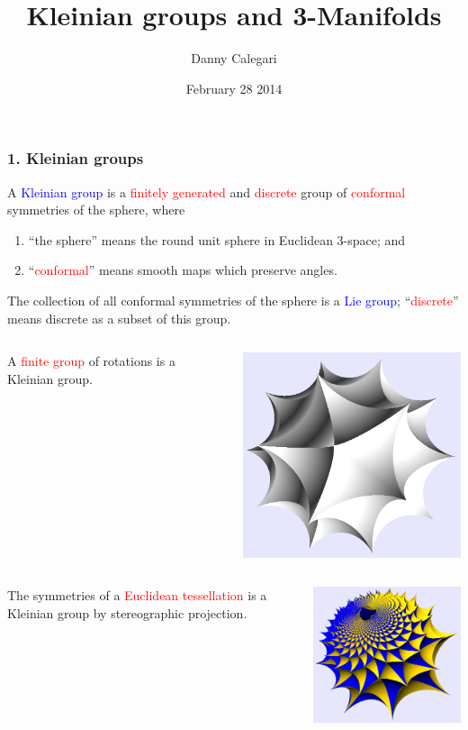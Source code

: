 \documentclass{beamer}
\title{Kleinian groups and 3-Manifolds}
\author{Danny Calegari}
\date{February 28 2014}
\begin{document}
\frame{\titlepage}
\frame
{
\frametitle{1. Kleinian groups}

A \textcolor{blue}{Kleinian group} is a \textcolor{red}{finitely generated} and 
\textcolor{red}{discrete} group of \textcolor{red}{conformal} symmetries of the 
\textcolor{dgreen}{sphere}, where

\begin{enumerate}
\item{``the \textcolor{dgreen}{sphere}'' means the round unit sphere in Euclidean 3-space; and}
\item{``\textcolor{red}{conformal}'' means smooth maps which preserve angles.}
\end{enumerate}

The collection of all conformal symmetries of the sphere is a \textcolor{blue}{Lie group}; ``\textcolor{red}{discrete}''
means discrete as a subset of this group.
}
\frame
{
\begin{columns}[c]
\column{1in}
A \textcolor{red}{finite group} of
rotations is a Kleinian group.
\column{3in}
\begin{center}
\includegraphics[width=3in]{icosahedron.png}
\end{center}
\end{columns}
}
\frame
{
\begin{columns}[c]
\column{1.1in}
The symmetries of a 
\textcolor{red}{Euclidean tessellation}
is a Kleinian group
by stereographic
projection.
\column{3in}
\begin{center}
\includegraphics[width=3in]{parabolic.png}
\end{center}
\end{columns}
}
\end{document}
